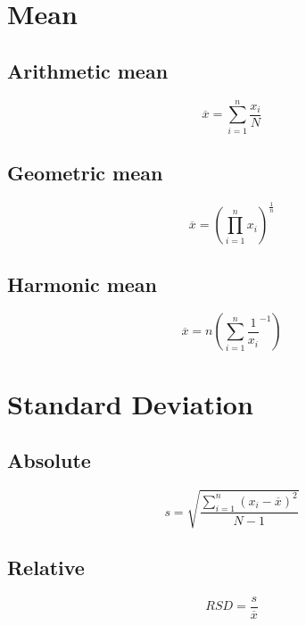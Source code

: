 \documentclass[Master.tex]{subfiles}
\begin{document}
\begin{multicols}{2}
		 \section{Mean}
		  \subsection{Arithmetic mean}
				   \[
						    \overline{x}= \sum_{i=1}^n \frac{x_i}{N}
				   \]
		  \subsection{Geometric mean}
				   \[
						    \overline{x}=(\prod_{i=1}^n x_i)^\frac{1}{n}
				   \]
		  \subsection{Harmonic mean}
				   \[
						    \overline{x}=n(\sum^n _{i=1} \frac{1}{x_i}^{-1})
				   \]
		 \section{Standard Deviation}
		  \subsection{Absolute}
				   \[
						    s=\sqrt{\frac{\sum_{i=1}^n (x_i - \overline{x})^2}{N-1}}
				   \]
		  \subsection{Relative}
				   \[RSD= \frac{s}{\overline{x}}
				   \]
\end{multicols}
\end{document}
